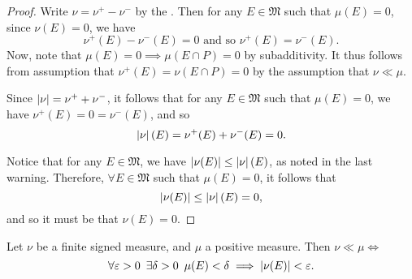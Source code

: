 \documentclass[notoc,notitlepage]{tufte-book}
\begin{document}
\begin{proof}
  Write $\nu = \nu^+ - \nu^-$ by the .
  Then for any $E \in \mathfrak{M}$ such that $\mu(E) = 0$,
  since $\nu(E) = 0$, we have
  \begin{equation*}
    \nu^+(E) - \nu^-(E) = 0 \text{ and so } \nu^+(E) = \nu^-(E).
  \end{equation*}
  Now, note that $\mu(E) = 0 \implies \mu(E \cap P) = 0$ by subadditivity.
  It thus follows from assumption that $\nu^+(E) = \nu(E \cap P) = 0$ by
  the assumption that $\nu \ll \mu$.

  \noindent
  Since $\left|\nu\right| = \nu^+ + \nu^-$, it follows that for any $E \in \mathfrak{M}$
  such that $\mu(E) = 0$, we have $\nu^+(E) = 0 = \nu^-(E)$, and so
  \begin{equation*}
    \left|\nu\right|(E) = \nu^+(E) + \nu^-(E) = 0.
  \end{equation*}

  \noindent
  Notice that for any $E \in \mathfrak{M}$, we have $\left|\nu(E)\right|
  \leq \left|\nu\right|(E)$, as noted in the last warning.
  Therefore, $\forall E \in \mathfrak{M}$ such that $\mu(E) = 0$, it follows
  that
  \begin{equation*}
    \left|\nu(E)\right| \leq \left|\nu\right|(E) = 0,
  \end{equation*}
  and so it must be that $\nu(E) = 0$.
\end{proof}

\begin{thm}\label{thm:alternative_definition_for_absolute_continuity_of_measures}
  Let $\nu$ be a finite signed measure, and $\mu$ a positive measure.
  Then $\nu \ll \mu \iff$
  \begin{equation*}
    \forall \varepsilon > 0\enspace \exists \delta > 0\enspace
    \mu(E) < \delta \implies \left|\nu(E)\right| < \varepsilon.
  \end{equation*}
\end{thm}
\end{document}
